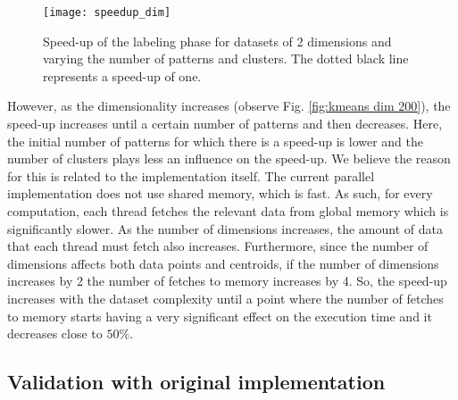 
\begin{figure}[hbtp]
    \centering
    \texttt{[image: speedup\_dim]}
    \caption{Speed-up of the labeling phase for datasets of 2 dimensions and varying the number of patterns and clusters. The dotted black line represents a speed-up of one.}
    \label{fig:kmeans dim 2}
\end{figure}

However, as the dimensionality increases (observe Fig. \ref{fig:kmeans dim 200}), the speed-up increases until a certain number of patterns and then decreases.
Here, the initial number of patterns for which there is a speed-up is lower and the number of clusters plays less an influence on the speed-up.
We believe the reason for this is related to the implementation itself.
The current parallel implementation does not use shared memory, which is fast.
As such, for every computation, each thread fetches the relevant data from global memory which is significantly slower.
As the number of dimensions increases, the amount of data that each thread must fetch also increases.
Furthermore, since the number of dimensions affects both data points and centroids, if the number of dimensions increases by 2 the number of fetches to memory increases by 4.
So, the speed-up increases with the dataset complexity until a point where the number of fetches to memory starts having a very significant effect on the execution time and it decreases close to $50\%$.


\subsection{Validation with original implementation}

